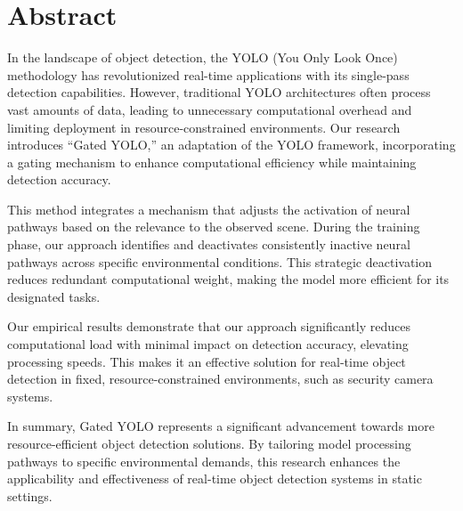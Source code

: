 \section*{Abstract} 						%

In the landscape of object detection, the YOLO (You Only Look Once) methodology has revolutionized real-time applications with its single-pass detection capabilities. However, traditional YOLO architectures often process vast amounts of data, leading to unnecessary computational overhead and limiting deployment in resource-constrained environments. Our research introduces ``Gated YOLO,'' an adaptation of the YOLO framework, incorporating a gating mechanism to enhance computational efficiency while maintaining detection accuracy.

This method integrates a mechanism that adjusts the activation of neural pathways based on the relevance to the observed scene. During the training phase, our approach identifies and deactivates consistently inactive neural pathways across specific environmental conditions. This strategic deactivation reduces redundant computational weight, making the model more efficient for its designated tasks.

Our empirical results demonstrate that our approach significantly reduces computational load with minimal impact on detection accuracy, elevating processing speeds. This makes it an effective solution for real-time object detection in fixed, resource-constrained environments, such as security camera systems.

In summary, Gated YOLO represents a significant advancement towards more resource-efficient object detection solutions. By tailoring model processing pathways to specific environmental demands, this research enhances the applicability and effectiveness of real-time object detection systems in static settings.

\clearpage

